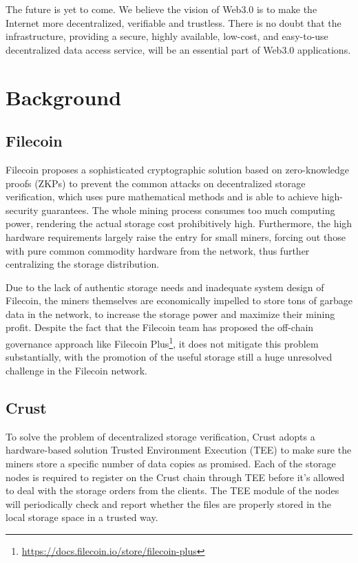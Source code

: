 \documentclass[]{article}
\begin{document}
The future is yet to come. We believe the vision of Web3.0 is to make the Internet more decentralized, verifiable and trustless. There is no doubt that the infrastructure, providing a secure, highly available, low-cost, and easy-to-use decentralized data access service, will be an essential part of Web3.0 applications.

\section{Background}

\subsection{Filecoin}

Filecoin\cite{filecoin} proposes a sophisticated cryptographic solution based on zero-knowledge proofs (ZKPs) to prevent the common attacks on decentralized storage verification, which uses pure mathematical methods and is able to achieve high-security guarantees. The whole mining process consumes too much computing power, rendering the actual storage cost prohibitively high. Furthermore, the high hardware requirements largely raise the entry for small miners, forcing out those with pure common commodity hardware from the network, thus further centralizing the storage distribution.

Due to the lack of authentic storage needs and inadequate system design of Filecoin, the miners themselves are economically impelled to store tons of garbage data in the network, to increase the storage power and maximize their mining profit. Despite the fact that the Filecoin team has proposed the off-chain governance approach like Filecoin Plus\footnote{\url{https://docs.filecoin.io/store/filecoin-plus}}, it does not mitigate this problem substantially, with the promotion of the useful storage still a huge unresolved challenge in the Filecoin network.

\subsection{Crust}

To solve the problem of decentralized storage verification, Crust\cite{crust} adopts a hardware-based solution Trusted Environment Execution (TEE) to make sure the miners store a specific number of data copies as promised. Each of the storage nodes is required to register on the Crust chain through TEE before it's allowed to deal with the storage orders from the clients. The TEE module of the nodes will periodically check and report whether the files are properly stored in the local storage space in a trusted way.
\end{document}
